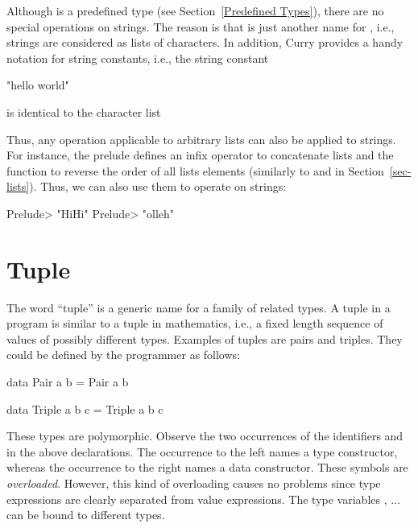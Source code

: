 Although  is a predefined type
(see Section~\ref{Predefined Types}), there are no special
operations on strings. The reason is that 
is just another name for \ccode {[Char]}, i.e., strings
are considered as lists of characters. In addition, Curry
provides a handy notation for string constants, i.e.,
the string constant
%
\begin{curry}
"hello world"
\end{curry}
%
is identical to the character list
%
\begin{curry}
['h','e','l','l','o',' ','w','o','r','l','d']
\end{curry}
%
Thus, any operation applicable to arbitrary lists can also be applied
to strings. For instance, the prelude defines an infix operator
\ccode{++}\pindex{++} to concatenate lists and the function
to reverse the order of all lists elements
(similarly to  and  in
Section~\ref{sec-lists}). Thus, we can also use them to operate on
strings:
%
\begin{prog}
Prelude> 
"HiHi"
Prelude> 
"olleh"
\end{prog}


\section{Tuple}

The word ``tuple'' is a generic name
for a family of related types.
A tuple in a program is similar to
a tuple in mathematics, i.e., a fixed
length sequence of values of possibly different types.
Examples of tuples are pairs and triples.
They could be defined by the programmer as follows:
%
\begin{curry}
data Pair a b = Pair a b

data Triple a b c = Triple a b c
\end{curry}
%
These types are polymorphic.  Observe the two occurrences of
the identifiers  and  in the above declarations.
The occurrence to the left names a type constructor,
whereas the occurrence to the right names a data constructor.
These symbols are \emph{overloaded}.
However, this kind of overloading causes no problems since
type expressions are clearly separated from value expressions.
The type variables , $\ldots$ can be bound
to different types.

